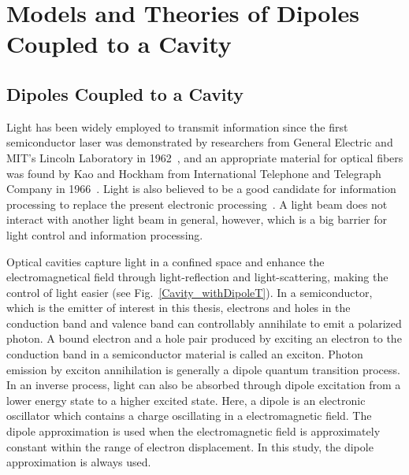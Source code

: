 \chapter[Models and Theories]{Models and Theories of Dipoles Coupled to a Cavity}\label{ch:theory}

\section{Dipoles Coupled to a Cavity}
Light has been widely employed to transmit information since the first semiconductor laser was demonstrated by researchers from General Electric and MIT's Lincoln Laboratory in 1962~\cite{Keyes1962}, and an appropriate material for optical fibers was found by Kao and Hockham from International Telephone and Telegraph Company in 1966~\cite{Kao1966}. Light is also believed to be a good candidate for information processing to replace the present electronic processing~\cite{Nagy2006a,Hemmer2005}. A light beam does not interact with another light beam in general, however, which is a big barrier for light control and information processing.

Optical cavities capture light in a confined space and enhance the electromagnetical field through light-reflection and light-scattering, making the control of light easier (see Fig.~\ref{Cavity_withDipoleT}). In a semiconductor, which is the emitter of interest in this thesis, electrons and holes in the conduction band and valence band can controllably annihilate to emit a polarized photon. A bound electron and a hole pair produced by exciting an electron to the conduction band in a semiconductor material is called an exciton. Photon emission by exciton annihilation is generally a dipole quantum transition process. In an inverse process, light can also be absorbed through dipole excitation from a lower energy state to a higher excited state. Here, a dipole is an electronic oscillator which contains a charge oscillating in a electromagnetic field. The dipole approximation is used when the electromagnetic field is approximately constant within the range of electron displacement. In this study, the dipole approximation is always used.

